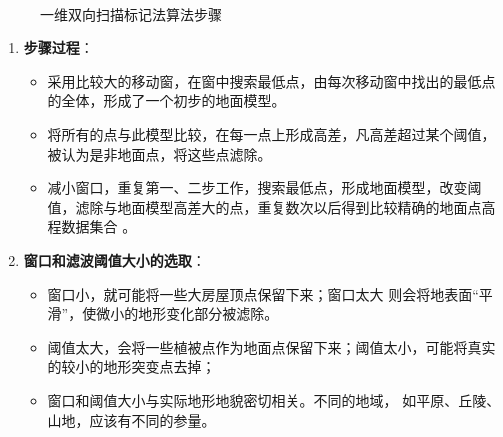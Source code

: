 \begin{enumerate}
\begin{figure}[htbp]
			 \\
			 \quad\quad\quad
			\caption{一维双向扫描标记法算法步骤}
			\label{fig:一维双向扫描标记法算法步骤}
		\end{figure}
\end{enumerate}

\begin{enumerate}
	\item \textbf{步骤过程}：
		\begin{itemize}
			\item 采用比较大的移动窗，在窗中搜索最低点，由每次移动窗中找出的最低点的全体，形成了一个初步的地面模型。
			\item 将所有的点与此模型比较，在每一点上形成高差，凡高差超过某个阈值，被认为是非地面点，将这些点滤除。
			\item 减小窗口，重复第一、二步工作，搜索最低点，形成地面模型，改变阈值，滤除与地面模型高差大的点，重复数次以后得到比较精确的地面点高程数据集合 。
		\end{itemize}
	\item \textbf{窗口和滤波阈值大小的选取}：
		\begin{itemize}
			\item 窗口小，就可能将一些大房屋顶点保留下来；窗口太大 则会将地表面“平滑”，使微小的地形变化部分被滤除。
			\item 阈值太大，会将一些植被点作为地面点保留下来；阈值太小，可能将真实的较小的地形突变点去掉；
			\item 窗口和阈值大小与实际地形地貌密切相关。不同的地域， 如平原、丘陵、山地，应该有不同的参量。
		\end{itemize}
\end{enumerate}

